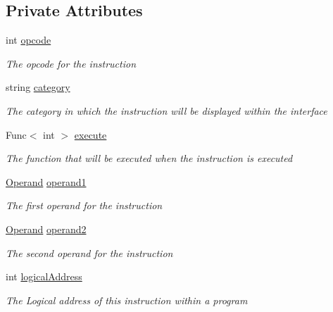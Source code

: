 \subsection*{Private Attributes}
\begin{DoxyCompactItemize}
\item 
int \hyperlink{class_c_p_u___o_s___simulator_1_1_c_p_u_1_1_instruction_aa8fa753bf6e1b6ffff7060ec90f930af}{opcode}
\begin{DoxyCompactList}\small\item\em The opcode for the instruction \end{DoxyCompactList}\item 
string \hyperlink{class_c_p_u___o_s___simulator_1_1_c_p_u_1_1_instruction_ac572af7b3bda0a6b0918069c1f3b14b4}{category}
\begin{DoxyCompactList}\small\item\em The category in which the instruction will be displayed within the interface \end{DoxyCompactList}\item 
Func$<$ int $>$ \hyperlink{class_c_p_u___o_s___simulator_1_1_c_p_u_1_1_instruction_ae6c5e3409f33f49c745ab57ca9a885a9}{execute}
\begin{DoxyCompactList}\small\item\em The function that will be executed when the instruction is executed \end{DoxyCompactList}\item 
\hyperlink{class_c_p_u___o_s___simulator_1_1_c_p_u_1_1_operand}{Operand} \hyperlink{class_c_p_u___o_s___simulator_1_1_c_p_u_1_1_instruction_ab829270aeebc597814ded59f5265b452}{operand1}
\begin{DoxyCompactList}\small\item\em The first operand for the instruction \end{DoxyCompactList}\item 
\hyperlink{class_c_p_u___o_s___simulator_1_1_c_p_u_1_1_operand}{Operand} \hyperlink{class_c_p_u___o_s___simulator_1_1_c_p_u_1_1_instruction_a76e9ca211aca72f65c8ad9e11fbdad47}{operand2}
\begin{DoxyCompactList}\small\item\em The second operand for the instruction \end{DoxyCompactList}\item 
int \hyperlink{class_c_p_u___o_s___simulator_1_1_c_p_u_1_1_instruction_a6577ac8b9582e24ec928bd4b59093960}{logical\+Address}
\begin{DoxyCompactList}\small\item\em The Logical address of this instruction within a program \end{DoxyCompactList}\item 

\end{DoxyCompactItemize}
